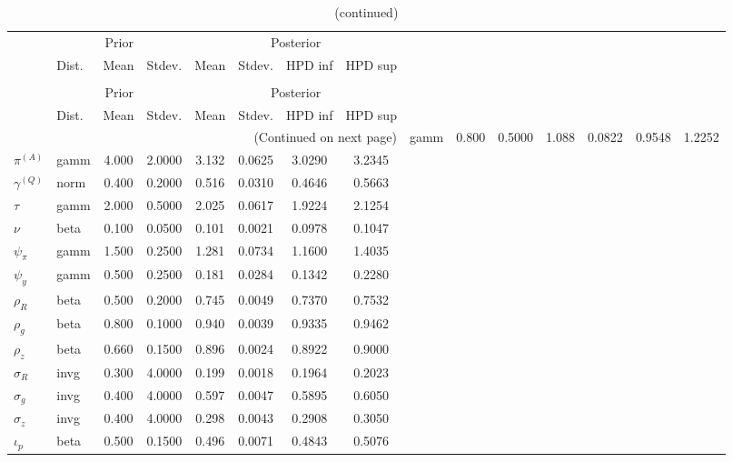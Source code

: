  
\begin{center}
\begin{longtable}{llcccccc} 
\caption{Results from Metropolis-Hastings (parameters)}
 \label{Table:MHPosterior:1}\\
\toprule 
  & \multicolumn{3}{c}{Prior}  &  \multicolumn{4}{c}{Posterior} \\
  \cmidrule(r{.75em}){2-4} \cmidrule(r{.75em}){5-8}
  & Dist. & Mean  & Stdev. & Mean & Stdev. & HPD inf & HPD sup\\
\midrule \endfirsthead 
\caption{(continued)}\\\toprule 
  & \multicolumn{3}{c}{Prior}  &  \multicolumn{4}{c}{Posterior} \\
  \cmidrule(r{.75em}){2-4} \cmidrule(r{.75em}){5-8}
  & Dist. & Mean  & Stdev. & Mean & Stdev. & HPD inf & HPD sup\\
\midrule \endhead 
\bottomrule \multicolumn{8}{r}{(Continued on next page)} \endfoot 
\bottomrule \endlastfoot 
${r_{A}}$ & gamm &   0.800 & 0.5000 &   1.088& 0.0822 &  0.9548 &  1.2252 \\ 
${\pi^{(A)}}$ & gamm &   4.000 & 2.0000 &   3.132& 0.0625 &  3.0290 &  3.2345 \\ 
${\gamma^{(Q)}}$ & norm &   0.400 & 0.2000 &   0.516& 0.0310 &  0.4646 &  0.5663 \\ 
${\tau}$ & gamm &   2.000 & 0.5000 &   2.025& 0.0617 &  1.9224 &  2.1254 \\ 
${\nu}$ & beta &   0.100 & 0.0500 &   0.101& 0.0021 &  0.0978 &  0.1047 \\ 
${\psi_\pi}$ & gamm &   1.500 & 0.2500 &   1.281& 0.0734 &  1.1600 &  1.4035 \\ 
${\psi_y}$ & gamm &   0.500 & 0.2500 &   0.181& 0.0284 &  0.1342 &  0.2280 \\ 
${\rho_R}$ & beta &   0.500 & 0.2000 &   0.745& 0.0049 &  0.7370 &  0.7532 \\ 
${\rho_{g}}$ & beta &   0.800 & 0.1000 &   0.940& 0.0039 &  0.9335 &  0.9462 \\ 
${\rho_z}$ & beta &   0.660 & 0.1500 &   0.896& 0.0024 &  0.8922 &  0.9000 \\ 
${\sigma_R}$ & invg &   0.300 & 4.0000 &   0.199& 0.0018 &  0.1964 &  0.2023 \\ 
${\sigma_{g}}$ & invg &   0.400 & 4.0000 &   0.597& 0.0047 &  0.5895 &  0.6050 \\ 
${\sigma_z}$ & invg &   0.400 & 4.0000 &   0.298& 0.0043 &  0.2908 &  0.3050 \\ 
${\iota_p}$ & beta &   0.500 & 0.1500 &   0.496& 0.0071 &  0.4843 &  0.5076 \\ 
\end{longtable}
 \end{center}
